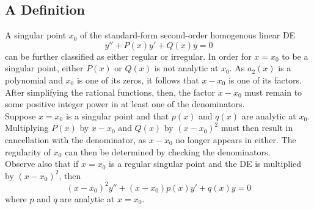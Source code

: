 \documentclass[./Differential Equations.tex]{subfiles}
\begin{document}
		\subsection{A Definition}
			A singular point \(x_0\) of the standard-form second-order homogenous linear DE
				\[y'' + P(x)y' + Q(x)y = 0\]
				can be further classified as either regular or irregular.
			In order for \(x = x_0\) to be a singular point, either \(P(x)\) or \(Q(x)\) is not analytic at \(x_0\). As \(a_2(x)\) is a polynomial and \(x_0\) is one of its zeros, it follows that \(x - x_0\) is one of its factors. After simplifying the rational functions, then, the factor \(x - x_0\) must remain to some positive integer power in at least one of the denominators. \\
			Suppose \(x = x_0\) is a singular point and that \(p(x)\) and \(q(x)\) are analytic at \(x_0\). Multiplying \(P(x)\) by \(x - x_0\) and \(Q(x)\) by \((x - x_0)^2\) must then result in cancellation with the denominator, as \(x - x_0\) no longer appears in either. The regularity of \(x_0\) can then be determined by checking the denominators. \\
			Observe also that if \(x = x_0\) is a regular singular point and the DE is multiplied by \((x - x_0)^2\), then
				\[(x - x_0)^2y'' + (x - x_0)p(x)y' + q(x)y = 0\]
				where \(p\) and \(q\) are analytic at \(x = x_0\).
\end{document}
